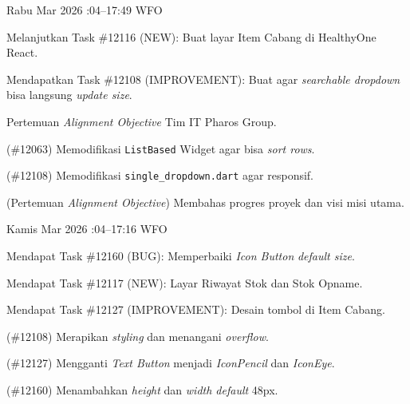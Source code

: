 \begin{logtable}
    {
        Rabu  Mar 2026 :04--17:49 \linebreak
        WFO
    }{
        \begin{loglist}
            \item Melanjutkan Task \#12116 (NEW): Buat layar Item Cabang di HealthyOne React.
            \item Mendapatkan Task \#12108 (IMPROVEMENT): Buat agar \textit{searchable dropdown}
            bisa langsung \textit{update size}.
            \item Pertemuan \textit{Alignment Objective} Tim IT Pharos Group.
        \end{loglist}
    }{
        \begin{logwork}
            \item (\#12063) Memodifikasi \texttt{ListBased} Widget agar bisa \textit{sort rows}.
            \item (\#12108) Memodifikasi \texttt{single\_dropdown.dart} agar responsif.
            \item (Pertemuan \textit{Alignment Objective}) Membahas progres proyek dan visi misi utama.
        \end{logwork}
    }

    {
        Kamis  Mar 2026 :04--17:16 \linebreak
        WFO
    }{
        \begin{loglist}
            \item Mendapat Task \#12160 (BUG): Memperbaiki \textit{Icon Button} \textit{default
                size}.
            \item Mendapat Task \#12117 (NEW): Layar Riwayat Stok dan Stok Opname.
            \item Mendapat Task \#12127 (IMPROVEMENT): Desain tombol di Item Cabang.
        \end{loglist}
    }{
        \begin{logwork}
            \item (\#12108) Merapikan \textit{styling} dan menangani \textit{overflow}.
            \item (\#12127) Mengganti \textit{Text Button} menjadi \textit{IconPencil} dan \textit{IconEye}.
            \item (\#12160) Menambahkan \textit{height} dan \textit{width default} 48px.
        \end{logwork}
    }


\end{logtable}
